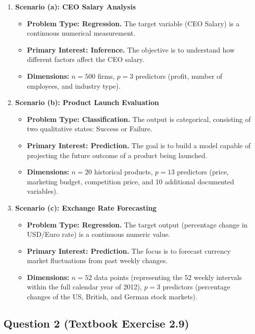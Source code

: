 \documentclass[12pt,a4paper]{article}
\begin{document}
\begin{enumerate}[label=\arabic*.]
\item \textbf{Scenario (a): CEO Salary Analysis}
\begin{itemize}
    \item \textbf{Problem Type: Regression.} The target variable (CEO Salary) is a continuous numerical measurement.
    \item \textbf{Primary Interest: Inference.} The objective is to understand how different factors affect the CEO salary.
    \item \textbf{Dimensions:} $n=500$ firms, $p=3$ predictors (profit, number of employees, and industry type).
\end{itemize}

\item \textbf{Scenario (b): Product Launch Evaluation}
\begin{itemize}
    \item \textbf{Problem Type: Classification.} The output is categorical, consisting of two qualitative states: Success or Failure.
    \item \textbf{Primary Interest: Prediction.} The goal is to build a model capable of projecting the future outcome of a product being launched.
    \item \textbf{Dimensions:} $n=20$ historical products, $p=13$ predictors (price, marketing budget, competition price, and 10 additional documented variables).
\end{itemize}

\item \textbf{Scenario (c): Exchange Rate Forecasting}
\begin{itemize}
    \item \textbf{Problem Type: Regression.} The target output (percentage change in USD/Euro rate) is a continuous numeric value.
    \item \textbf{Primary Interest: Prediction.} The focus is to forecast currency market fluctuations from past weekly changes.
    \item \textbf{Dimensions:} $n=52$ data points (representing the 52 weekly intervals within the full calendar year of 2012), $p=3$ predictors (percentage changes of the US, British, and German stock markets).
\end{itemize}
\end{enumerate}

\subsection*{Question 2 (Textbook Exercise 2.9)}
\end{document}
